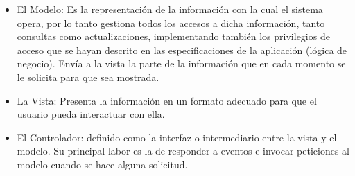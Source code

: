 \begin{itemize}

\item El Modelo: Es la representación de la información con la cual el sistema opera, por lo tanto gestiona todos los accesos a dicha información, tanto consultas como actualizaciones, implementando también los privilegios de acceso que se hayan descrito en las especificaciones de la aplicación (lógica de negocio). Envía a la vista la parte de la información que en cada momento se le solicita para que sea mostrada.

\item La Vista: Presenta la información en un formato adecuado para que el usuario pueda interactuar con ella.

\item El Controlador: definido como la interfaz o intermediario entre la vista y el modelo. Su principal labor es la de responder a eventos e invocar peticiones al modelo cuando se hace alguna solicitud. 

\end{itemize}



